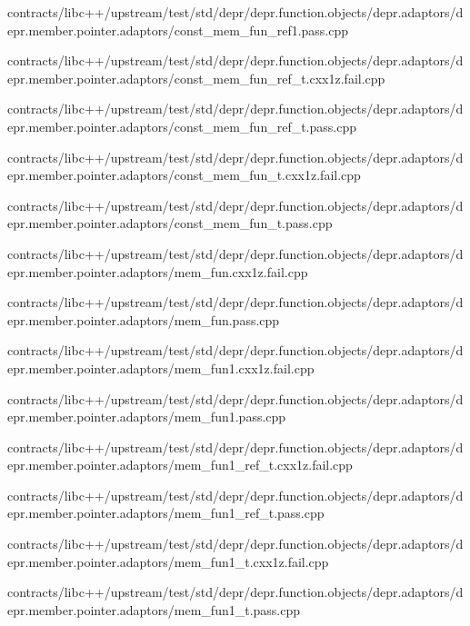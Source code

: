 \begin{DoxyCompactItemize}
contracts/libc++/upstream/test/std/depr/depr.\+function.\+objects/depr.\+adaptors/depr.\+member.\+pointer.\+adaptors/const\+\_\+mem\+\_\+fun\+\_\+ref1.\+pass.\+cpp\item 
contracts/libc++/upstream/test/std/depr/depr.\+function.\+objects/depr.\+adaptors/depr.\+member.\+pointer.\+adaptors/const\+\_\+mem\+\_\+fun\+\_\+ref\+\_\+t.\+cxx1z.\+fail.\+cpp\item 
contracts/libc++/upstream/test/std/depr/depr.\+function.\+objects/depr.\+adaptors/depr.\+member.\+pointer.\+adaptors/const\+\_\+mem\+\_\+fun\+\_\+ref\+\_\+t.\+pass.\+cpp\item 
contracts/libc++/upstream/test/std/depr/depr.\+function.\+objects/depr.\+adaptors/depr.\+member.\+pointer.\+adaptors/const\+\_\+mem\+\_\+fun\+\_\+t.\+cxx1z.\+fail.\+cpp\item 
contracts/libc++/upstream/test/std/depr/depr.\+function.\+objects/depr.\+adaptors/depr.\+member.\+pointer.\+adaptors/const\+\_\+mem\+\_\+fun\+\_\+t.\+pass.\+cpp\item 
contracts/libc++/upstream/test/std/depr/depr.\+function.\+objects/depr.\+adaptors/depr.\+member.\+pointer.\+adaptors/mem\+\_\+fun.\+cxx1z.\+fail.\+cpp\item 
contracts/libc++/upstream/test/std/depr/depr.\+function.\+objects/depr.\+adaptors/depr.\+member.\+pointer.\+adaptors/mem\+\_\+fun.\+pass.\+cpp\item 
contracts/libc++/upstream/test/std/depr/depr.\+function.\+objects/depr.\+adaptors/depr.\+member.\+pointer.\+adaptors/mem\+\_\+fun1.\+cxx1z.\+fail.\+cpp\item 
contracts/libc++/upstream/test/std/depr/depr.\+function.\+objects/depr.\+adaptors/depr.\+member.\+pointer.\+adaptors/mem\+\_\+fun1.\+pass.\+cpp\item 
contracts/libc++/upstream/test/std/depr/depr.\+function.\+objects/depr.\+adaptors/depr.\+member.\+pointer.\+adaptors/mem\+\_\+fun1\+\_\+ref\+\_\+t.\+cxx1z.\+fail.\+cpp\item 
contracts/libc++/upstream/test/std/depr/depr.\+function.\+objects/depr.\+adaptors/depr.\+member.\+pointer.\+adaptors/mem\+\_\+fun1\+\_\+ref\+\_\+t.\+pass.\+cpp\item 
contracts/libc++/upstream/test/std/depr/depr.\+function.\+objects/depr.\+adaptors/depr.\+member.\+pointer.\+adaptors/mem\+\_\+fun1\+\_\+t.\+cxx1z.\+fail.\+cpp\item 
contracts/libc++/upstream/test/std/depr/depr.\+function.\+objects/depr.\+adaptors/depr.\+member.\+pointer.\+adaptors/mem\+\_\+fun1\+\_\+t.\+pass.\+cpp\item 

\end{DoxyCompactItemize}
